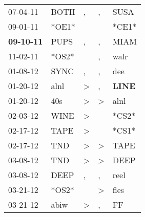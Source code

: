 \begin{supertabular}{p{0.07\textwidth}p{0.06\textwidth}p{0.02\textwidth}p{0.02\textwidth}p{0.06\textwidth}}
          07-04-11\textsuperscript{} &           BOTH\textsuperscript{} &                , &                , &           SUSA\textsuperscript{} \\
          09-01-11\textsuperscript{} &                            *OE1* &                  &                  &                            *CE1* \\
 \textbf{09-10-11\textsuperscript{}} &           PUPS\textsuperscript{} &                , &                , &           MIAM\textsuperscript{} \\
          11-02-11\textsuperscript{} &                            *OS2* &                  &                , &           walr\textsuperscript{} \\
          01-08-12\textsuperscript{} &           SYNC\textsuperscript{} &                , &                , &            dee\textsuperscript{} \\
          01-20-12\textsuperscript{} &           alnl\textsuperscript{} &     \textgreater &                , &  \textbf{LINE\textsuperscript{}} \\
          01-20-12\textsuperscript{} &            40s\textsuperscript{} &     \textgreater &     \textgreater &           alnl\textsuperscript{} \\
          02-03-12\textsuperscript{} &           WINE\textsuperscript{} &     \textgreater &                  &                            *CS2* \\
          02-17-12\textsuperscript{} &           TAPE\textsuperscript{} &     \textgreater &                  &                            *CS1* \\
          02-17-12\textsuperscript{} &            TND\textsuperscript{} &     \textgreater &     \textgreater &           TAPE\textsuperscript{} \\
          03-08-12\textsuperscript{} &            TND\textsuperscript{} &     \textgreater &     \textgreater &           DEEP\textsuperscript{} \\
          03-08-12\textsuperscript{} &           DEEP\textsuperscript{} &                , &                , &           reel\textsuperscript{} \\
          03-21-12\textsuperscript{} &                            *OS2* &                  &     \textgreater &           fles\textsuperscript{} \\
          03-21-12\textsuperscript{} &           abiw\textsuperscript{} &     \textgreater &                , &             FF\textsuperscript{} \\

\end{supertabular}
